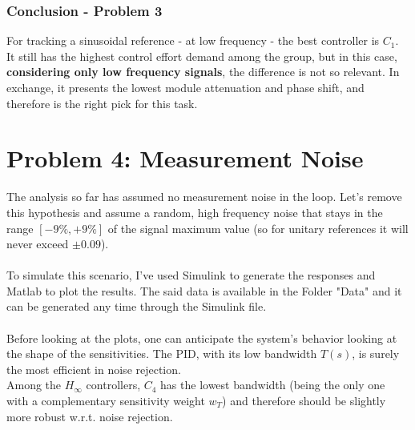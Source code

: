 \documentclass[a4paper, 12pt]{article}
\begin{document}
\subsubsection{Conclusion - Problem 3}
For tracking a sinusoidal reference - at low frequency - the best controller is $C_1$. It still has the highest control effort demand among the group, but in this case, \textbf{considering only low frequency signals}, the difference is not so relevant. In exchange, it presents the lowest module attenuation and phase shift, and therefore is the right pick for this task.

\section{Problem 4: Measurement Noise}
The analysis so far has assumed no measurement noise in the loop. Let's remove this hypothesis and assume a random, high frequency noise that stays in the range $[-9\%,+9\%]$ of the signal maximum value (so for unitary references it will never exceed $\pm0.09$).\\\\
To simulate this scenario, I've used Simulink to generate the responses and Matlab to plot the results. 
The said data is available in the Folder "Data" and it can be generated any time through the Simulink file.
\\\\
Before looking at the plots, one can anticipate the system's behavior looking at the shape of the sensitivities. The PID, with its low bandwidth $T(s)$, is surely the most efficient in noise rejection.\\
Among the $H_\infty$ controllers, $C_4$ has the lowest bandwidth (being the only one with a complementary sensitivity weight $w_T$) and therefore should be slightly more robust w.r.t. noise rejection.
\end{document}
